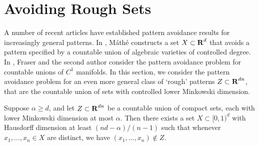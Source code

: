 
\chapter{Avoiding Rough Sets}
\label{ch:RoughSets}

A number of recent articles have established pattern avoidance results for increasingly general patterns. In \cite{Mathe}, M\'{a}th\'{e} constructs a set $X\subset\operatorname{\mathbf{R}}^d$ that avoids a pattern specified by a countable union of algebraic varieties of controlled degree. In \cite{MalabikaRob}, Fraser and the second author consider the pattern avoidance problem for countable unions of $C^1$ manifolds. In this section, we consider the pattern avoidance problem for an even more general class of `rough' patterns $Z \subset \operatorname{\mathbf{R}}^{dn}$, that are the countable union of sets with controlled lower Minkowski dimension.
%

\begin{theorem}\label{mainTheorem}
	Suppose $\alpha \geq d$, and let $Z \subset \operatorname{\mathbf{R}}^{dn}$ be a countable union of compact sets, each with lower Minkowski dimension at most $\alpha$. Then there exists a set $X \subset [0,1)^d$ with Hausdorff dimension at least $(nd - \alpha)/(n-1)$ such that whenever $x_1, \dots, x_n \in X$ are distinct, we have $(x_1, \dots, x_n) \not \in Z$.
\end{theorem}

